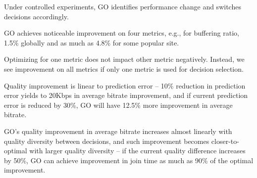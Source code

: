 \begin{packedenumerate}
	\item Under controlled experiments, GO identifies performance change and switches decisions accordingly.
	\item GO achieves noticeable improvement on four metrics, e.g., for buffering ratio, 1.5\% globally and as much as 4.8\% for some popular site.
	\item Optimizing for one metric does not impact other metric negatively. Instead, we see improvement on all metrics if only one metric is used for decision selection.
	\item Quality improvement is linear to prediction error -- 10\% reduction in prediction error yields to 20Kbps in average bitrate improvement, and if current prediction error is reduced by 30\%, GO will have 12.5\% more improvement in average bitrate.
	\item GO's quality improvement in average bitrate increases almost linearly with quality diversity between decisions, and such improvement becomes closer-to-optimal with larger quality diversity -- if the current quality difference increases by 50\%, GO can achieve improvement in join time as much as 90\% of the optimal improvement.
\end{packedenumerate}


